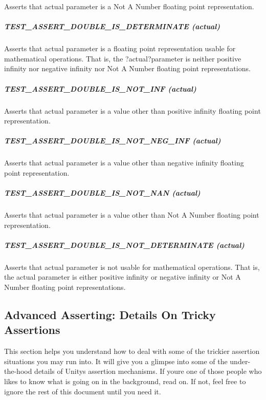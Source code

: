 Asserts that {\ttfamily actual} parameter is a Not A Number floating point representation.

\subparagraph*{{\ttfamily T\+E\+S\+T\+\_\+\+A\+S\+S\+E\+R\+T\+\_\+\+D\+O\+U\+B\+L\+E\+\_\+\+I\+S\+\_\+\+D\+E\+T\+E\+R\+M\+I\+N\+A\+TE (actual)}}

Asserts that {\ttfamily actual} parameter is a floating point representation usable for mathematical operations. That is, the ?actual?parameter is neither positive infinity nor negative infinity nor Not A Number floating point representations.

\subparagraph*{{\ttfamily T\+E\+S\+T\+\_\+\+A\+S\+S\+E\+R\+T\+\_\+\+D\+O\+U\+B\+L\+E\+\_\+\+I\+S\+\_\+\+N\+O\+T\+\_\+\+I\+NF (actual)}}

Asserts that {\ttfamily actual} parameter is a value other than positive infinity floating point representation.

\subparagraph*{{\ttfamily T\+E\+S\+T\+\_\+\+A\+S\+S\+E\+R\+T\+\_\+\+D\+O\+U\+B\+L\+E\+\_\+\+I\+S\+\_\+\+N\+O\+T\+\_\+\+N\+E\+G\+\_\+\+I\+NF (actual)}}

Asserts that {\ttfamily actual} parameter is a value other than negative infinity floating point representation.

\subparagraph*{{\ttfamily T\+E\+S\+T\+\_\+\+A\+S\+S\+E\+R\+T\+\_\+\+D\+O\+U\+B\+L\+E\+\_\+\+I\+S\+\_\+\+N\+O\+T\+\_\+\+N\+AN (actual)}}

Asserts that {\ttfamily actual} parameter is a value other than Not A Number floating point representation.

\subparagraph*{{\ttfamily T\+E\+S\+T\+\_\+\+A\+S\+S\+E\+R\+T\+\_\+\+D\+O\+U\+B\+L\+E\+\_\+\+I\+S\+\_\+\+N\+O\+T\+\_\+\+D\+E\+T\+E\+R\+M\+I\+N\+A\+TE (actual)}}

Asserts that {\ttfamily actual} parameter is not usable for mathematical operations. That is, the {\ttfamily actual} parameter is either positive infinity or negative infinity or Not A Number floating point representations.

\subsection*{Advanced Asserting\+: Details On Tricky Assertions}

This section helps you understand how to deal with some of the trickier assertion situations you may run into. It will give you a glimpse into some of the under-\/the-\/hood details of Unity\textquotesingle{}s assertion mechanisms. If you\textquotesingle{}re one of those people who likes to know what is going on in the background, read on. If not, feel free to ignore the rest of this document until you need it.

